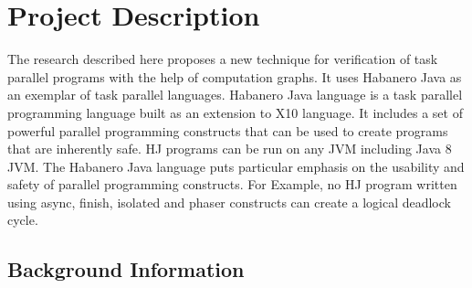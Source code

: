 \section{Project Description}
The research described here proposes a new technique for verification of task parallel programs with the help of computation graphs. It uses Habanero Java as an exemplar of task parallel languages. Habanero Java language is a task parallel programming language built as an extension to X10 language. It includes a set of powerful parallel programming constructs that can be used to create programs that are inherently safe. HJ programs can be run on any JVM including Java 8 JVM.  The Habanero Java language puts particular emphasis on the usability and safety of parallel programming constructs. For Example, no HJ program written using async, finish, isolated and phaser constructs can create a logical deadlock cycle.

\subsection{Background Information}

